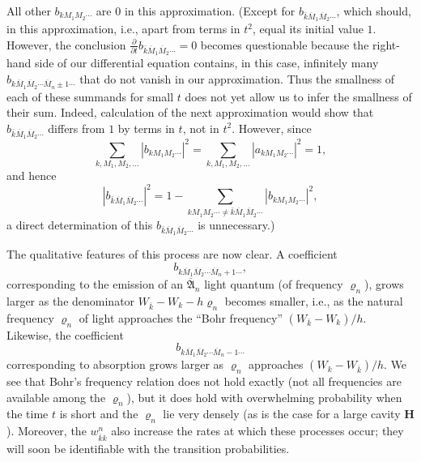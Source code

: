 \documentclass[fontsize=13pt,twoside,openany,headings=normal,parskip=false,bookmarkpackage=false,DIV=calc]{scrbook}
\begin{document}
All other $b_{kM_1M_2\cdots}$ are $0$ in this approximation. (Except for $b_{\bar k\overline M_1\overline M_2\cdots}$, which should, in this approximation, i.e., apart from terms in $t^2$, equal its initial value $1$. However, the conclusion $\frac\partial{\partial t}b_{\bar k\overline M_1\overline M_2\cdots}=0$ becomes questionable because the right-hand side of our differential equation contains, in this case, infinitely many $b_{k\overline M_1\overline M_2\cdots\overline M_n\pm1\cdots}$ that do not vanish in our approximation. Thus the smallness of each of these summands for small $t$ does not yet allow us to infer the smallness of their sum. Indeed, calculation of the next approximation would show that $b_{\bar k\overline M_1\overline M_2\cdots}$ differs from $1$ by terms in $t$, not in $t^2$. However, since
\[
 \sum_{k,M_1,M_2,\ldots}|b_{kM_1M_2\cdots}|^2
 =\sum_{k,M_1,M_2,\ldots}|a_{kM_1M_2\cdots}|^2=1,
\]
and hence
\[
 |b_{\bar k\overline M_1\overline M_2\cdots}|^2
 =1-\sum_{kM_1M_2\cdots\ne\bar k\overline M_1\overline M_2\cdots}|b_{kM_1M_2\cdots}|^2,
\]
a direct determination of this $b_{\bar k\overline M_1\overline M_2\cdots}$ is unnecessary.)

The qualitative features of this process are now clear. A coefficient
\[
b_{k\overline M_1\overline M_2\cdots\overline M_n+1\cdots},
\]
corresponding to the emission of an $\overline{\mathfrak A}_n$ light quantum (of frequency $\varrho_n$), grows larger as the denominator $W_{\bar k}-W_k-h\varrho_n$ becomes smaller, i.e., as the natural frequency $\varrho_n$ of light approaches the ``Bohr frequency'' $(W_{\bar k}-W_k)/h$. Likewise, the coefficient
\[
b_{k\overline M_1\overline M_2\cdots\overline M_n-1\cdots}
\]
corresponding to absorption grows larger as $\varrho_n$ approaches $(W_k-W_{\bar k})/h$. We see that Bohr's frequency relation does not hold exactly (not all frequencies are available among the $\varrho_n$), but it does hold with overwhelming probability when the time $t$ is short and the $\varrho_n$ lie very densely (as is the case for a large cavity $\boldsymbol H$). Moreover, the $w_{\bar k k}^n$ also increase the rates at which these processes occur; they will soon be identifiable with the transition probabilities.
\end{document}
